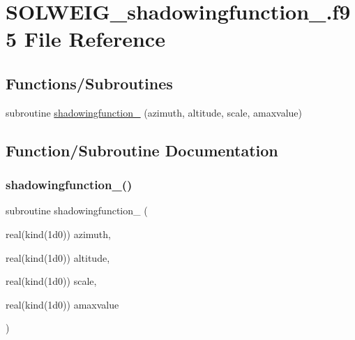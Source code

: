 \hypertarget{_s_o_l_w_e_i_g__shadowingfunction__20_8f95}{}\section{S\+O\+L\+W\+E\+I\+G\+\_\+shadowingfunction\+\_.\+f95 File Reference}
\label{_s_o_l_w_e_i_g__shadowingfunction__20_8f95}
\subsection*{Functions/\+Subroutines}
\begin{DoxyCompactItemize}
\item 
subroutine \hyperlink{_s_o_l_w_e_i_g__shadowingfunction__20_8f95_a7bdc758721fd0ff5725789e037ea7469}{shadowingfunction\+\_} (azimuth, altitude, scale, amaxvalue)
\end{DoxyCompactItemize}


\subsection{Function/\+Subroutine Documentation}
\mbox{\label{_s_o_l_w_e_i_g__shadowingfunction__20_8f95_a7bdc758721fd0ff5725789e037ea7469}} 
\subsubsection{\texorpdfstring{shadowingfunction\+\_()}{shadowingfunction\_20()}}
{\footnotesize\ttfamily subroutine shadowingfunction\+\_ (\begin{DoxyParamCaption}\item[{real(kind(1d0))}]{azimuth,  }\item[{real(kind(1d0))}]{altitude,  }\item[{real(kind(1d0))}]{scale,  }\item[{real(kind(1d0))}]{amaxvalue }\end{DoxyParamCaption})}



